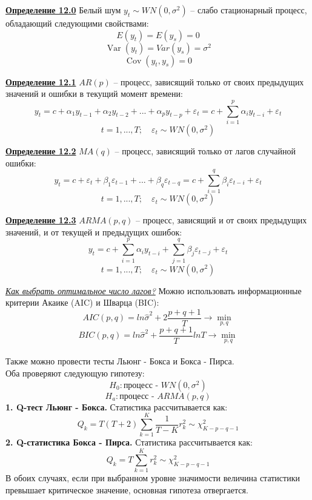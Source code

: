 \documentclass[a0,final]{a0poster}
\DeclareMathOperator{\Var}{Var}
\DeclareMathOperator{\Cov}{Cov}
\begin{document}
\begin{multicols}{4}
\begin{tcolorbox}[colback=green!5!white,colframe=green!75!black]
\textbf{\underline{Определение 12.0}} Белый шум $y_t \sim WN(0, \sigma^2)$ -- слабо стационарный процесс, обладающий следующими свойствами:
$$E(y_t)=E(y_s)=0$$
$$\Var(y_t) = Var(y_s) = \sigma^2 $$
$$\Cov(y_t,y_s) = 0$$
\end{tcolorbox}

\begin{tcolorbox}[colback=red!5!white,colframe=red!75!black]
\textbf{\underline{Определение 12.1}} $AR(p)$ -- процесс, зависящий только от своих предыдущих значений и ошибки в текущий момент времени: $$y_t = c + \alpha_1y_{t-1} + \alpha_2y_{t-2}+...+\alpha_py_{t-p} + \varepsilon_t = c + \sum\limits_{i=1}^p \alpha_iy_{t-i} + \varepsilon_t$$
$$t=1,...,T; \quad \varepsilon_t \sim WN(0, \sigma^2)$$
\end{tcolorbox}

\begin{tcolorbox}[colback=red!5!white,colframe=red!75!black]
\textbf{\underline{Определение 12.2}} $MA(q)$ -- процесс, зависящий только от лагов случайной ошибки: $$y_t = c +  \varepsilon_t + \beta_1\varepsilon_{t-1}+...+\beta_q\varepsilon_{t-q}= c + \sum\limits_{i=1}^q \beta_i\varepsilon_{t-i} + \varepsilon_t$$
$$t=1,...,T; \quad \varepsilon_t \sim WN(0, \sigma^2)$$
\end{tcolorbox}

\begin{tcolorbox}[colback=red!5!white,colframe=red!75!black]
\textbf{\underline{Определение 12.3}} $ARMA(p,q)$ -- процесс, зависящий и от своих предыдущих значений, и от текущей и предыдущих ошибок: $$y_t = c +  \sum\limits_{i=1}^p \alpha_iy_{t-i} + \sum\limits_{j=1}^q \beta_j\varepsilon_{t-j} + \varepsilon_t$$
$$t=1,...,T; \quad \varepsilon_t \sim WN(0, \sigma^2)$$
\end{tcolorbox}

\underline{\textit{Как выбрать оптимальное число лагов?}} Можно использовать информационные критерии Акаике (AIC) и Шварца (BIC):
$$AIC(p,q) = ln\hat{\sigma}^2+2\frac{p+q+1}{T} \longrightarrow \min\limits_{p,q}$$
$$BIC(p,q) = ln\hat{\sigma}^2 +\frac{p+q+1}{T}lnT \longrightarrow \min\limits_{p,q}$$
\\
Также можно провести тесты Льюнг - Бокса и Бокса - Пирса.\\ Оба проверяют следующую гипотезу:
$$H_0: \text{процесс - } WN(0,\sigma^2)$$
$$H_a: \text{процесс - } ARMA(p,q) $$
\textbf{1. Q-тест Льюнг - Бокса.} Статистика рассчитывается как:
$$Q_k = T(T+2)\sum\limits_{k=1}^K \frac{1}{T-K}r^2_k \sim \chi^2_{K-p-q-1}$$
\textbf{2. Q-статистика Бокса - Пирса.} Статистика рассчитывается как:
$$Q_k = T\sum\limits_{k=1}^K r^2_k \sim \chi^2_{K-p-q-1}$$
В обоих случаях, если при выбранном уровне значимости величина статистики превышает критическое значение, основная гипотеза отвергается.\\



\end{multicols}
\end{document}
